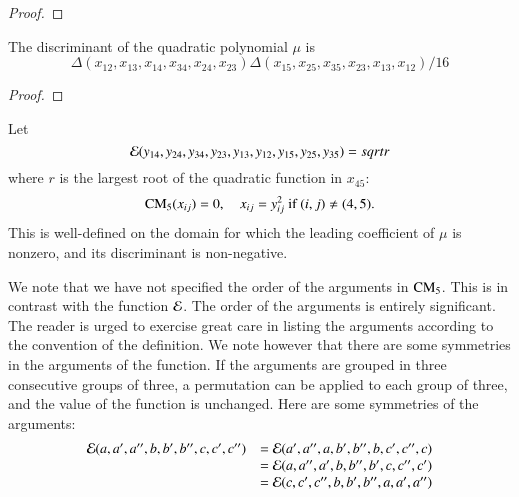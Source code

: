 \begin{tarskidata}
\begin{tarski}
\begin{proof}
\end{proof}
\end{tarski}





\begin{tarski}

\begin{lemma}
The discriminant of the quadratic polynomial $\mu$ is
	$$
	\Delta(x_{12}, x_{13}, x_{14}, x_{34}, x_{24}, x_{23}) 
	\Delta(x_{15}, x_{25}, x_{35}, x_{23}, 
          x_{13}, x_{12}) /16
	$$
\end{lemma}

\begin{proof}
\end{proof}
\end{tarski}




\begin{tarski}

\begin{definition}[$\CalE$] 
Let 
$${\mathcal E}(y_{14},y_{24},y_{34},y_{23},y_{13},y_{12},y_{15},y_{25},y_{35})=sqrt{r}$$
where $r$ is the largest root of the quadratic function in $x_{45}$:
	$$
	{\operatorname{CM}}_5(x_{ij}) = 0,\quad x_{ij} = y_{ij}^2 \hbox{ if } (i,j)\ne (4,5).
	$$
This is well-defined on the domain for which the leading coefficient of $\mu$ is nonzero, and its
discriminant is non-negative.  
\end{definition}
We note that we have not specified the order of the arguments in ${\operatorname{CM}}_5$.   This is in
contrast with the function $\CalE$.  The order of the arguments is entirely significant.
The reader is urged to exercise great care in listing the arguments according to the
convention of the definition.  We note however that there are some symmetries in the
arguments of the function.  
If the arguments are grouped in three consecutive groups of three, a permutation
can be applied to each group of three, and the value of the function is unchanged.  Here
are some symmetries of the arguments:
	$$
	\begin{array}{lll}
	{\mathcal E}(a,a',a'',b,b',b'',c,c',c'') &= {\mathcal E}(a',a'',a,b',b'',b,c',c'',c)\\
			&={\mathcal E}(a,a'',a',b,b'',b',c,c'',c')\\
			&= {\mathcal E}(c,c',c'',b,b',b'',a,a',a'')\\
	\end{array}
	$$
\end{tarski}



\end{tarskidata}
